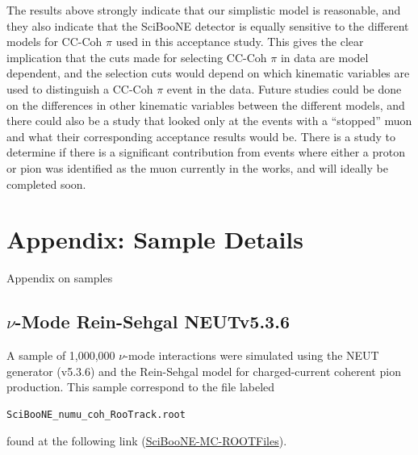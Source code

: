 \documentclass[11pt]{article}
\begin{document}
The results above strongly indicate that our simplistic model is reasonable, and they also indicate that the SciBooNE detector is equally sensitive to the different models for CC-Coh $\pi$ used in this acceptance study. This gives the clear implication that the cuts made for selecting CC-Coh $\pi$ in data are model dependent, and the selection cuts would depend on which kinematic variables are used to distinguish a CC-Coh $\pi$ event in the data. Future studies could be done on the differences in other kinematic variables between the different models, and there could also be a study that looked only at the events with a ``stopped'' muon and what their corresponding acceptance results would be. There is a study to determine if there is a significant contribution from events where either a proton or pion was identified as the muon currently in the works, and will ideally be completed soon.


%
\newpage

\appendix


\section{Appendix: Sample Details}
\label{sec:SampleAppendix}

Appendix on samples

\subsection{$\nu$-Mode Rein-Sehgal NEUTv5.3.6}
\label{sub:NMRSv5.3.6}
A sample of 1,000,000 $\nu$-mode interactions were simulated using the NEUT generator (v5.3.6) and the Rein-Sehgal model for charged-current coherent pion production. This sample correspond to the file labeled 
\begin{verbatim}
SciBooNE_numu_coh_RooTrack.root
\end{verbatim}
found at the following link (\href{https://drive.google.com/open?id=0B4rvJl9swUOxcEtpSl94RDRsc3c}{SciBooNE-MC-ROOTFiles}).
\end{document}
